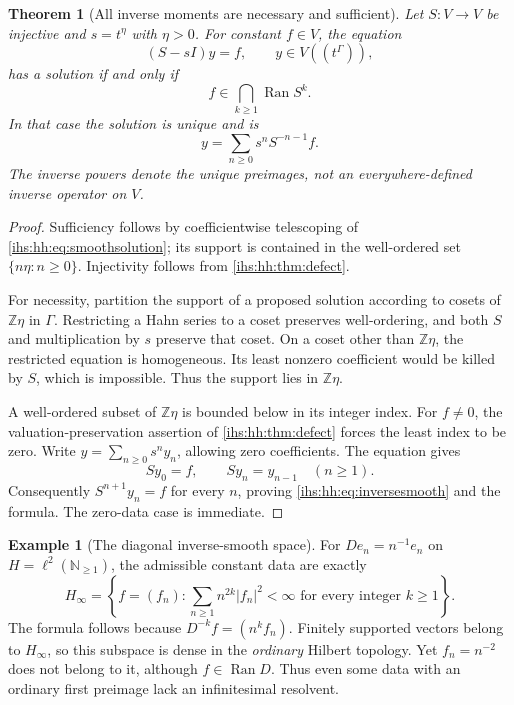 \documentclass[11pt,a4paper]{article}
\numberwithin{equation}{section}
\newtheorem{theorem}{Theorem}[section]
\theoremstyle{definition}
\newtheorem{example}[example]{Example}
\theoremstyle{remark}
\newcommand{\N}{\mathbb N}
\newcommand{\Z}{\mathbb Z}
\newcommand{\Ran}{\operatorname{Ran}}
\begin{document}
\begin{theorem}[All inverse moments are necessary and sufficient]\label{ihs:hh:thm:smooth}
Let $S:V\to V$ be injective and $s=t^\eta$ with $\eta>0$. For constant
$f\in V$, the equation
\begin{equation}\label{ihs:hh:eq:constres}
 (S-sI)y=f,\qquad y\in V((t^\Gamma)),
\end{equation}
has a solution if and only if
\begin{equation}\label{ihs:hh:eq:inversesmooth}
 f\in\bigcap_{k\ge1}\Ran S^k.
\end{equation}
In that case the solution is unique and is
\begin{equation}\label{ihs:hh:eq:smoothsolution}
 y=\sum_{n\ge0}s^n S^{-n-1}f.
\end{equation}
The inverse powers denote the unique preimages, not an everywhere-defined
inverse operator on $V$.
\end{theorem}
\begin{proof}
Sufficiency follows by coefficientwise telescoping of
\eqref{ihs:hh:eq:smoothsolution}; its support is contained in the
well-ordered set $\{n\eta:n\ge0\}$. Injectivity follows from
\cref{ihs:hh:thm:defect}.

For necessity, partition the support of a proposed solution according to
cosets of $\Z\eta$ in $\Gamma$. Restricting a Hahn series to a coset
preserves well-ordering, and both $S$ and multiplication by $s$ preserve
that coset. On a coset other than $\Z\eta$, the restricted equation is
homogeneous. Its least nonzero coefficient would be killed by $S$, which is
impossible. Thus the support lies in $\Z\eta$.

A well-ordered subset of $\Z\eta$ is bounded below in its integer index. For
$f\ne0$, the valuation-preservation assertion of \cref{ihs:hh:thm:defect}
forces the least index to be zero. Write $y=\sum_{n\ge0}s^n y_n$, allowing
zero coefficients. The equation gives
\[
 Sy_0=f,\qquad Sy_n=y_{n-1}\quad(n\ge1).
\]
Consequently $S^{n+1}y_n=f$ for every $n$, proving
\eqref{ihs:hh:eq:inversesmooth} and the formula. The zero-data case is
immediate.
\end{proof}

\begin{example}[The diagonal inverse-smooth space]\label{ihs:hh:ex:smoothD}
For $De_n=n^{-1}e_n$ on $H=\ell^2(\N_{\ge1})$, the admissible constant data
are exactly
\begin{equation}\label{ihs:hh:eq:rapidspace}
 H_\infty=\left\{f=(f_n):
       \sum_{n\ge1}n^{2k}|f_n|^2<\infty
       \text{ for every integer }k\ge1\right\}.
\end{equation}
The formula follows because $D^{-k}f=(n^k f_n)$. Finitely supported vectors
belong to $H_\infty$, so this subspace is dense in the \emph{ordinary}
Hilbert topology. Yet $f_n=n^{-2}$ does not belong to it, although
$f\in\Ran D$. Thus even some data with an ordinary first preimage lack an
infinitesimal resolvent.
\end{example}
\end{document}
